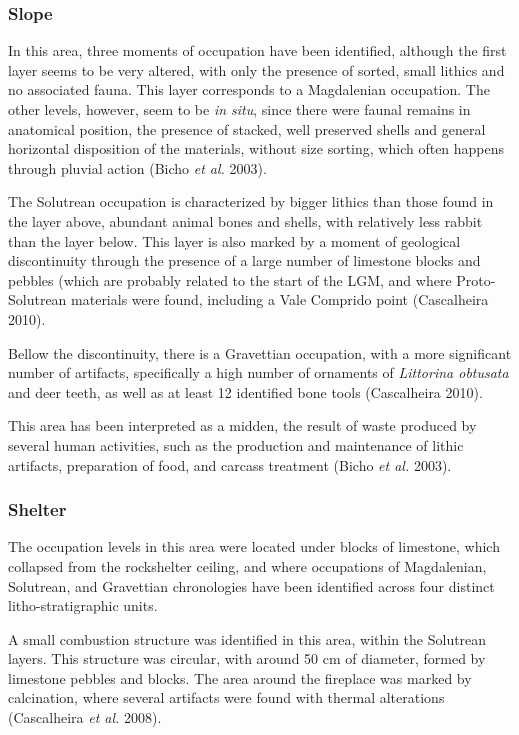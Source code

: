 \documentclass[12pt,twoside]{reedthesis}
\begin{document}
\hypertarget{slope}{%
\subsubsection{Slope}\label{slope}}

In this area, three moments of occupation have been identified, although the first layer seems to be very altered, with only the presence of sorted, small lithics and no associated fauna. This layer corresponds to a Magdalenian occupation. The other levels, however, seem to be \emph{in situ}, since there were faunal remains in anatomical position, the presence of stacked, well preserved shells and general horizontal disposition of the materials, without size sorting, which often happens through pluvial action (Bicho \emph{et al.} 2003).

The Solutrean occupation is characterized by bigger lithics than those found in the layer above, abundant animal bones and shells, with relatively less rabbit than the layer below. This layer is also marked by a moment of geological discontinuity through the presence of a large number of limestone blocks and pebbles (which are probably related to the start of the LGM, and where Proto-Solutrean materials were found, including a Vale Comprido point (Cascalheira 2010).

Bellow the discontinuity, there is a Gravettian occupation, with a more significant number of artifacts, specifically a high number of ornaments of \emph{Littorina obtusata} and deer teeth, as well as at least 12 identified bone tools (Cascalheira 2010).

This area has been interpreted as a midden, the result of waste produced by several human activities, such as the production and maintenance of lithic artifacts, preparation of food, and carcass treatment (Bicho \emph{et al.} 2003).

\hypertarget{shelter}{%
\subsubsection{Shelter}\label{shelter}}

The occupation levels in this area were located under blocks of limestone, which collapsed from the rockshelter ceiling, and where occupations of Magdalenian, Solutrean, and Gravettian chronologies have been identified across four distinct litho-stratigraphic units.

A small combustion structure was identified in this area, within the Solutrean layers. This structure was circular, with around 50 cm of diameter, formed by limestone pebbles and blocks. The area around the fireplace was marked by calcination, where several artifacts were found with thermal alterations (Cascalheira \emph{et al.} 2008).
\end{document}
